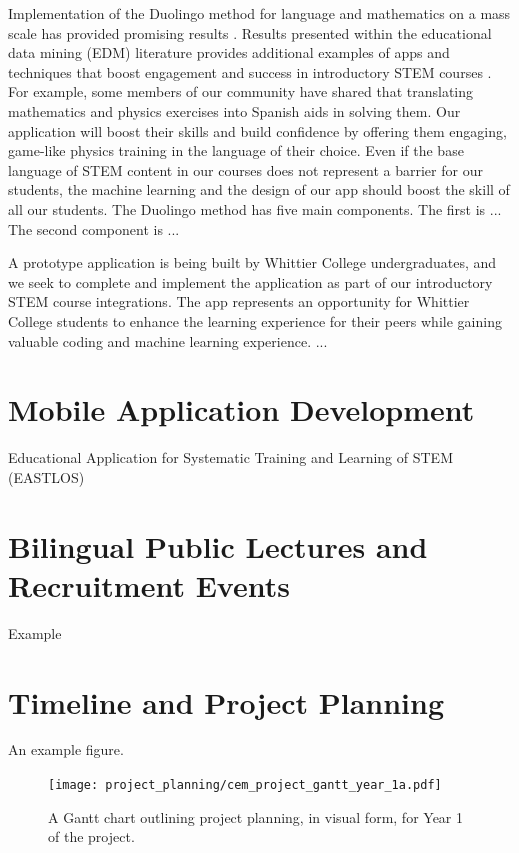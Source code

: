 \documentclass[../../main.tex]{subfiles}
\begin{document}
Implementation of the Duolingo method for language and mathematics on a mass scale has provided promising results \cite{duolingo_whitepaper}.  Results presented within the educational data mining (EDM) literature provides additional examples of apps and techniques that boost engagement and success in introductory STEM courses \cite{edm1,edm2,edm3,edm4}.  For example, some members of our community have shared that translating mathematics and physics exercises into Spanish aids in solving them.  Our application will boost their skills and build confidence by offering them engaging, game-like physics training in the language of their choice.  Even if the base language of STEM content in our courses does not represent a barrier for our students, the machine learning and the design of our app should boost the skill of all our students.  The Duolingo method has five main components.  The first is ... The second component is ... \\ \vspace{2.5mm}

A prototype application is being built by Whittier College undergraduates, and we seek to complete and implement the application as part of our introductory STEM course integrations.  The app represents an opportunity for Whittier College students to enhance the learning experience for their peers while gaining valuable coding and machine learning experience.  ...

\section{Mobile Application Development}

Educational Application for Systematic Training and Learning of STEM (EASTLOS)

\section{Bilingual Public Lectures and Recruitment Events}

Example

\section{Timeline and Project Planning}
\label{sec:time_im}

An example figure.

\begin{figure}
\centering
\texttt{[image: project\_planning/cem\_project\_gantt\_year\_1a.pdf]}
\caption{\label{fig:gantt_1a} A Gantt chart outlining project planning, in visual form, for Year 1 of the project.}
\end{figure}
\end{document}
